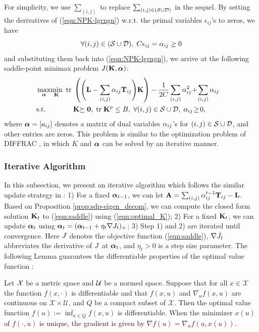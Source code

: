 For simplicity, we use $\sum_{(i,j)}$ to replace $\sum_{(i,j) \in ({\cal S}\cup{\cal D})}$ in the sequel. By setting the derivatives of (\ref{eqn:NPK-lgrngn}) w.r.t. the primal variables $\epsilon_{ij}$'s
to zeros, we have
\[
\forall (i,j) \in({\cal S}\cup{\cal D}),\; C\epsilon_{ij}= {\alpha}_{ij}\geq 0
\]
and substituting them back into (\ref{eqn:NPK-lgrngn}), we arrive at the following
saddle-point minimax problem $J({\bf K},{\boldsymbol{\alpha}})$:
\begin{eqnarray}
\!\!\!\!&\!\!\max_{\ba}\!\min_{\K}\!\!&\!\tr\left(\Bigg(\L-\sum_{(i,j)}
\a_{ij}\T_{ij}\Bigg)\K\right)
- \frac{1}{2C}\sum_{(i,j)}\a_{ij}^2\!+\!\sum_{(i,j)} \a_{ij} \label{eqn:saddle}\\
\!\!\!\!&\!\!\mbox{s.t.}\!&\!\K\psd,\;\tr \K^p\leq B,\;\forall
(i,j)\in\SS\cup\DD, \; \a_{ij}\!\geq\!
0,\;\;\;\;\;\;\;\nonumber
\end{eqnarray}
where ${\boldsymbol{\alpha}}=[a_{ij}]$ denotes a matrix of dual variables ${\alpha}_{ij}$'s for $(i,j)\in {\cal S}\cup{\cal D}$, and other entries
are zeros. This problem is similar to the optimization problem of DIFFRAC \cite{nips/BachH08}, in which  $K$ and ${\boldsymbol{\alpha}}$ can be solved by an iterative manner.

\subsubsection{Iterative Algorithm}



In this subsection, we present an iterative algorithm which follows the similar update strategy
in \cite{siam/BoydX05}: 1)
For a fixed ${\boldsymbol{\alpha}}_{t-1}$, we can let
${\bf A}=\sum_{(i,j) }{\alpha}_{ij}^{t-1}{\bf T}_{ij} - {\bf L}$. Based on Proposition \ref{prop:sdp-eigen_decom}, we can compute the closed form solution ${\bf K}_t$ to (\ref{eqn:saddle})
using (\ref{eqn:optimal_K});
 2) For a fixed ${\bf K}_t$, we can update ${\boldsymbol{\alpha}}_{t}$ using ${\boldsymbol{\alpha}}_t =
({\boldsymbol{\alpha}}_{t-1} + \eta_t \nabla J_t)_+$; 3) Step 1) and 2) are iterated until convergence.
Here $J$ denotes the objective function (\ref{eqn:saddle}), $\nabla J_t$ abbreviates the derivative of $J$ at ${\boldsymbol{\alpha}}_t$, and $\eta_t>0$ is a step size parameter. The following Lemma guarantees the differentiable properties of the
optimal value function \cite{siam/BonnansS98,nips/YingCG09}:
\begin{lemma} \label{lemma:derivative}
Let $\cal X$ be a metric space and $\cal U$ be a normed space. Suppose that for all
$x\in \mathcal X$ the function $f(x, \cdot)$ is differentiable and that $f(x, u)$ and
$\nabla_{u}f(x, u)$ are continuous on $\mathcal X \times \mathcal U$, and $Q$ be a
compact subset of $\mathcal X$. Then the optimal value function $f(u) := \inf_{x \in
Q} f(x, u)$ is differentiable. When the minimizer $x(u)$ of $f(\cdot, u)$ is unique, the
gradient is given by $\nabla f(u) = \nabla_{u}f(u, x(u))$.
\end{lemma}

